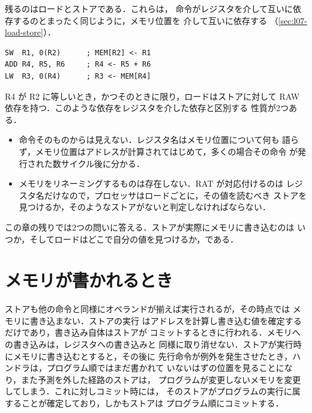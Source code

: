 \documentclass[../main.tex]{subfiles}
\begin{document}
残るのはロードとストアである．これらは，
命令がレジスタを介して互いに依存するのとまったく同じように，メモリ位置を
介して互いに依存する
（\cref{sec:l07-load-store}）．
\begin{lstlisting}[language={[x86masm]Assembler}, numbers=none]
SW  R1, 0(R2)      ; MEM[R2] <- R1
ADD R4, R5, R6     ; R4 <- R5 + R6
LW  R3, 0(R4)      ; R3 <- MEM[R4]
\end{lstlisting}
R4 が R2 に等しいとき，かつそのときに限り，ロードはストアに対して RAW
依存を持つ．このような依存をレジスタを介した依存と区別する
性質が2つある．
\begin{itemize}
  \item 命令そのものからは見えない．レジスタ名はメモリ位置について何も
    語らず，メモリ位置はアドレスが計算されてはじめて，多くの場合その命令
    が発行された数サイクル後に分かる．
  \item メモリをリネーミングするものは存在しない．RAT が対応付けるのは
    レジスタ名だけなので，プロセッサはロードごとに，その値を読むべき
    ストアを見つけるか，そのようなストアがないと判定しなければならない．
\end{itemize}
この章の残りでは2つの問いに答える．ストアが実際にメモリに書き込むのは
いつか，そしてロードはどこで自分の値を見つけるか，である．

\section{メモリが書かれるとき}
\label{sec:l09-write}

ストアも他の命令と同様にオペランドが揃えば実行されるが，その時点では
メモリに書き込まない．ストアの実行
はアドレスを計算し書き込む値を確定するだけであり，書き込み自体はストアが
コミットするときに行われる．メモリへの書き込みは，レジスタへの書き込みと
同様に取り消せない．ストアが実行時にメモリに書き込むとすると，その後に
先行命令が例外を発生させたとき，ハンドラは，プログラム順ではまだ書かれて
いないはずの位置を見ることになり，また予測を外した経路のストアは，
プログラムが変更しないメモリを変更してしまう．これに対しコミット時には，
そのストアがプログラムの実行に属することが確定しており，しかもストアは
プログラム順にコミットする．
\end{document}
